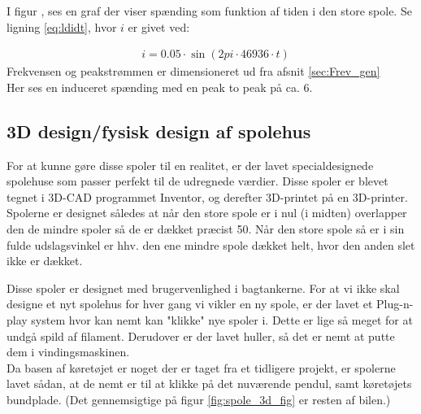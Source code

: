 I figur , ses en graf der viser spænding som funktion af tiden i den store spole. Se ligning \ref{eq:ldidt}, hvor $i$ er givet ved: 

\begin{align}
&i=0.05\cdot \sin{(2pi\cdot 46936\cdot t)}
\end{align}
Frekvensen og peakstrømmen er dimensioneret ud fra afsnit \ref{sec:Frev_gen} \\
Her ses en induceret spænding med en peak to peak på ca. 6\volt.









 






\subsection{3D design/fysisk design af spolehus}\label{sec:3D_design}
For at kunne gøre disse spoler til en realitet, er der lavet specialdesignede spolehuse som passer perfekt til de udregnede værdier. Disse spoler er blevet tegnet i 3D-CAD programmet Inventor, og derefter 3D-printet på en 3D-printer. \\

Spolerne er designet således at når den store spole er i nul (i midten) overlapper den de mindre spoler så de er dækket præcist 50\percent. Når den store spole så er i sin fulde udslagsvinkel er hhv. den ene mindre spole dækket helt, hvor den anden slet ikke er dækket. \\


Disse spoler er designet med brugervenlighed i bagtankerne. For at vi ikke skal designe et nyt spolehus for hver gang vi vikler en ny spole, er der lavet et Plug-n-play system hvor kan nemt kan "klikke" nye spoler i. Dette er lige så meget for at undgå spild af filament. Derudover er der lavet huller, så det er nemt at putte dem i vindingsmaskinen. \\

Da basen af køretøjet er noget der er taget fra et tidligere projekt, er spolerne lavet sådan, at de nemt er til at klikke på det nuværende pendul, samt køretøjets bundplade. (Det gennemsigtige på figur \ref{fig:spole_3d_fig} er resten af bilen.)\\


